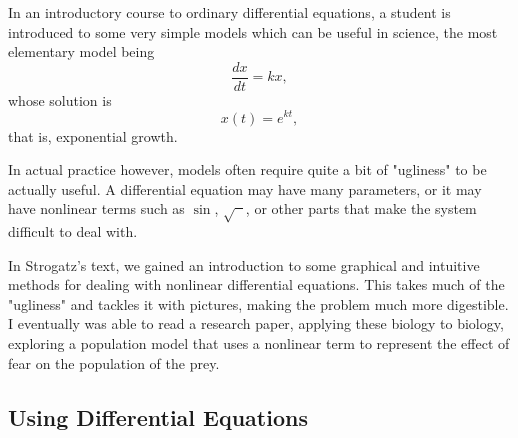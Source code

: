 \documentclass[a5paper]{article}
\theoremstyle{definition}%
\numberwithin{exercise}{section}
\theoremstyle{remark}%
\begin{document}
In an introductory course to ordinary differential equations, a student is introduced to some very simple models which can be useful in science, the most elementary model being 
$$\frac{dx}{dt}=kx,$$
whose solution is 
$$x(t)=e^{kt},$$
that is, exponential growth. 

In actual practice however, models often require quite a bit of "ugliness" to be actually useful. A differential equation may have many parameters, or it may have nonlinear terms such as $\sin$, $\sqrt{\phantom{x}}$, or other parts that make the system difficult to deal with. 

In Strogatz's text, we gained an introduction to some
graphical and intuitive methods for dealing with nonlinear differential equations. This takes much of the "ugliness" and tackles it with pictures, making the problem much more digestible. I eventually was able to read a research paper, applying these biology to biology, exploring a population model that uses a nonlinear term to represent the effect of fear on the population of the prey. 

\subsection{Using Differential Equations}

\end{document}
